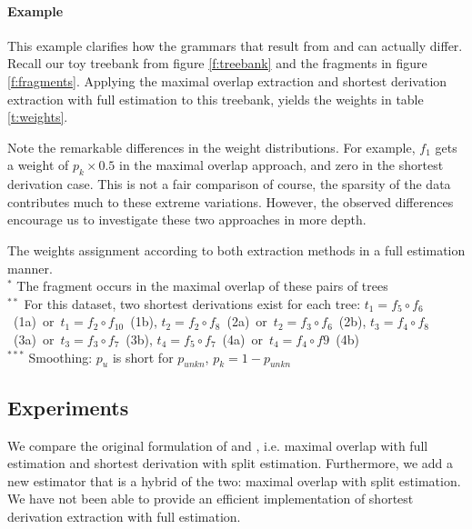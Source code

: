 \paragraph{Example}
\FloatBarrier
This example clarifies how the grammars that result from \ddop{} and \dops{} can actually differ. Recall our toy treebank from figure \ref{f:treebank} and the fragments in figure \ref{f:fragments}. 
Applying the maximal overlap extraction and shortest derivation extraction with full estimation to this treebank, yields the weights in table \ref{t:weights}.

Note the remarkable differences in the weight distributions. For example, $f_1$ gets a weight of $p_k\times 0.5$ in the maximal overlap approach, and zero in the shortest derivation case. This is not a fair comparison of course, the sparsity of the data contributes much to these extreme variations. However, the observed differences encourage us to investigate these two approaches in more depth.


\begin{table*}[t]
\center

\caption{The weights assignment according to both extraction methods in a full estimation manner.\\
{\footnotesize$^*$ The fragment occurs in the maximal overlap of these pairs of trees\\
$^{**}$ For this dataset, two shortest derivations exist for each tree:
$t_1=f_5\circ f_6$~(1a)~or~$t_1=f_2\circ f_{10}$~(1b), 	$t_2=f_2\circ f_8$~(2a)~or~$t_2=f_3\circ f_6$~(2b),
$t_3=f_4\circ f_8$~(3a)~or~$t_3=f_3\circ f_7$~(3b),	$t_4=f_5\circ f_7$~(4a)~or~$t_4=f_4\circ f9$~(4b)\\
$^{***}$ Smoothing: $p_u$ is short for $p_{unkn}$, $p_k = 1- p_{unkn}$
}
}
\label{t:weights}
\end{table*}




\subsection{Experiments}

We compare the original formulation of \ddop{} and \dops{}, i.e. maximal overlap with full estimation and shortest derivation with split estimation. Furthermore, we add a new estimator that is a hybrid of the two: maximal overlap with split estimation. We have not been able to provide an efficient  implementation of shortest derivation extraction with full estimation.


